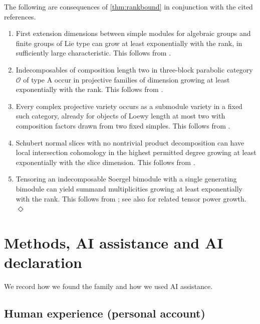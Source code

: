 \documentclass[a4paper,11pt]{amsart}
\let\emph\relax
\numberwithin{equation}{subsection}
\theoremstyle{plain}
\theoremstyle{definition}
\theoremstyle{remark}
\begin{document}
\begin{remark}
The following are consequences of \autoref{thm:rankbound}
in conjunction with the cited references.
\begin{enumerate}[label=\emph{\upshape(\alph*)}]
\color{black}
\item
First extension dimensions between simple modules for algebraic
groups and finite groups of Lie type can grow at least exponentially
with the rank, in sufficiently large characteristic. This follows from
\cite{ParshallScott,SX}.

\item
Indecomposables of composition length two in three-block parabolic
category $\mathcal O$ of type A occur in projective families of
dimension growing at least exponentially with the rank. This follows from
\cite{BGS,KoMazorchukMrden}.

\item
Every complex projective variety occurs as a submodule variety
in a fixed such category, already for objects of Loewy length at
most two with composition factors drawn from two fixed simples. This follows from
\cite{KoMazorchukMrden,RingelGrassmannians}.

\item
Schubert normal slices with no nontrivial product decomposition
can have local intersection cohomology in the highest permitted
degree growing at least exponentially with the slice dimension. This follows from
\cite{deCataldoMigliorini,KLPositivity}.

\item
Tensoring an indecomposable Soergel bimodule with a single
generating bimodule can yield summand multiplicities growing
at least exponentially with the rank. This follows from \cite{EliasWilliamson,KL};
see also \cite{GrowthAffineHecke} for related tensor power growth.
\nobreak\hfill{$\Diamond$}
\end{enumerate}
\end{remark}
\endgroup

\section{Methods, AI assistance and AI declaration}\label{sec:methods}

We record how we found the family and how we used AI assistance.

\subsection{Human experience (personal account)}
\end{document}
